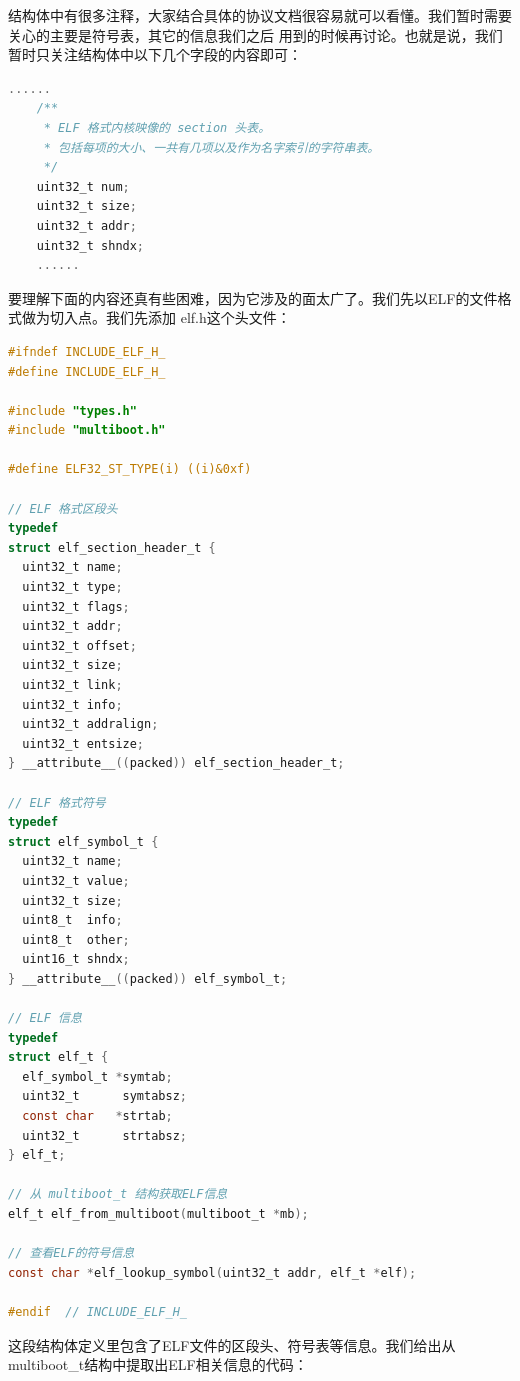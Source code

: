 \par 结构体中有很多注释，大家结合具体的协议文档很容易就可以看懂。我们暂时需要关心的主要是符号表，其它的信息我们之后\allowbreak
用到的时候再讨论。也就是说，我们暂时只关注结构体中以下几个字段的内容即可：

\begin{lstlisting}[language = C, caption = include/multiboot.h]
	......
	/**
	 * ELF 格式内核映像的 section 头表。
	 * 包括每项的大小、一共有几项以及作为名字索引的字符串表。
	 */
	uint32_t num;
	uint32_t size;
	uint32_t addr;
	uint32_t shndx;
	......
\end{lstlisting}

要理解下面的内容还真有些困难，因为它涉及的面太广了。我们先以ELF的文件格式做为切入点。我们先添加\allowbreak
elf.h这个头文件：

\begin{lstlisting}[language = C, caption = include/elf.h]
#ifndef INCLUDE_ELF_H_
#define INCLUDE_ELF_H_

#include "types.h"
#include "multiboot.h"

#define ELF32_ST_TYPE(i) ((i)&0xf)

// ELF 格式区段头
typedef
struct elf_section_header_t {
  uint32_t name;
  uint32_t type;
  uint32_t flags;
  uint32_t addr;
  uint32_t offset;
  uint32_t size;
  uint32_t link;
  uint32_t info;
  uint32_t addralign;
  uint32_t entsize;
} __attribute__((packed)) elf_section_header_t;

// ELF 格式符号
typedef
struct elf_symbol_t {
  uint32_t name;
  uint32_t value;
  uint32_t size;
  uint8_t  info;
  uint8_t  other;
  uint16_t shndx;
} __attribute__((packed)) elf_symbol_t;

// ELF 信息
typedef
struct elf_t {
  elf_symbol_t *symtab;
  uint32_t      symtabsz;
  const char   *strtab;
  uint32_t      strtabsz;
} elf_t;

// 从 multiboot_t 结构获取ELF信息
elf_t elf_from_multiboot(multiboot_t *mb);

// 查看ELF的符号信息
const char *elf_lookup_symbol(uint32_t addr, elf_t *elf);

#endif 	// INCLUDE_ELF_H_
\end{lstlisting}

\par 这段结构体定义里包含了ELF文件的区段头、符号表等信息。我们给出从multiboot\_t结构中提取出ELF相关信息的代码：


